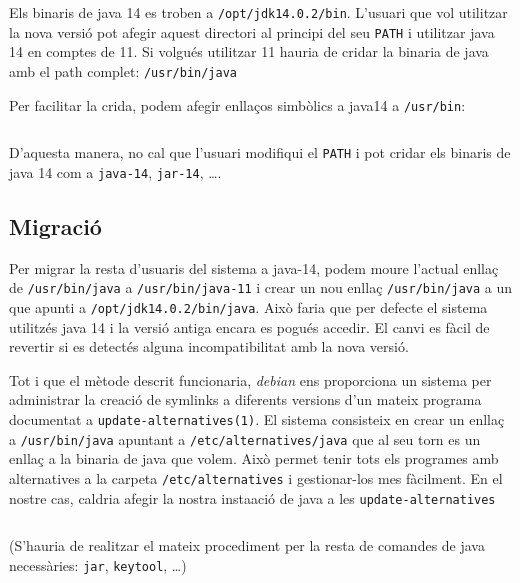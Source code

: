 \documentclass[12pt, oneside]{article}
\begin{document}
\inputminted{shell-session}{download}

Els binaris de java 14 es troben a \texttt{/opt/jdk14.0.2/bin}. L'usuari que vol
utilitzar la nova versió pot afegir aquest directori al principi del seu
\texttt{PATH} i utilitzar java 14 en comptes de 11. Si volgués utilitzar 11
hauria de cridar la binaria de java amb el path complet: \texttt{/usr/bin/java}

Per facilitar la crida, podem afegir enllaços simbòlics a java14 a
\texttt{/usr/bin}:

\inputminted{shell-session}{links}

D'aquesta manera, no cal que l'usuari modifiqui el \texttt{PATH} i pot cridar
els binaris de java 14 com a \texttt{java-14}, \texttt{jar-14}, \dots.

\pagebreak
\subsection*{Migració}

Per migrar la resta d'usuaris del sistema a java-14, podem moure l'actual
enllaç de \texttt{/usr/bin/java} a \texttt{/usr/bin/java-11} i crear un nou
enllaç \texttt{/usr/bin/java} a un que apunti a \texttt{/opt/jdk14.0.2/bin/java}.
Això faria que per defecte el sistema utilitzés java 14 i la versió antiga
encara es pogués accedir. El canvi es fàcil de revertir si es detectés alguna
incompatibilitat amb la nova versió.

Tot i que el mètode descrit funcionaria, \emph{debian} ens proporciona un sistema per
administrar la creació de symlinks a diferents versions d'un mateix programa
documentat a \texttt{update-alternatives(1)}. El sistema consisteix en crear un
enllaç a \texttt{/usr/bin/java} apuntant a \texttt{/etc/alternatives/java} que
al seu torn es un enllaç a la binaria de java que volem. Això permet tenir tots
els programes amb alternatives a la carpeta \texttt{/etc/alternatives} i
gestionar-los mes fàcilment. En el nostre cas, caldria afegir la nostra
insta\lgem ació de java a les \texttt{update-alternatives}

\inputminted{shell-session}{aptinstall}

(S'hauria de realitzar el mateix procediment per la resta de comandes de java
necessàries: \texttt{jar}, \texttt{keytool}, \dots)
\end{document}
